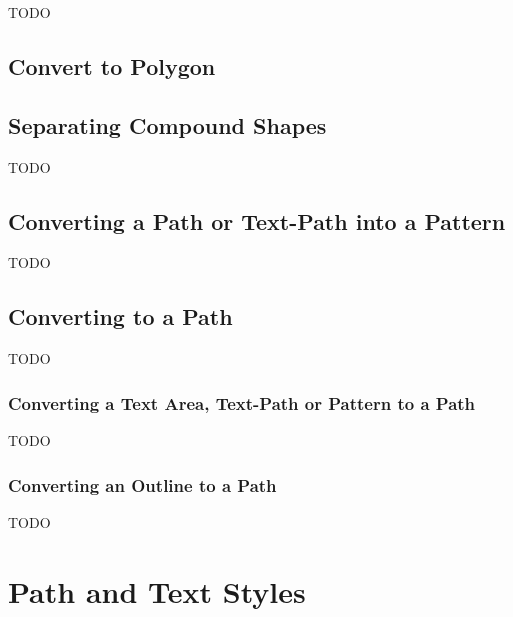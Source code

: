 
TODO


\section{Convert to Polygon}\label{sec:converttopolygon}



\section{Separating Compound Shapes}\label{sec:separate}


TODO


\section{Converting a Path or Text-Path into a Pattern}\label{sec:patterns}





TODO


\section{Converting to a Path}\label{sec:converttopath}



TODO


\subsection{Converting a Text Area, Text-Path or Pattern to a Path}\label{sec:texttopath}

TODO


\subsection{Converting an Outline to a Path}\label{sec:outlinetopath}

TODO


\chapter{Path and Text Styles}\label{sec:styles}

